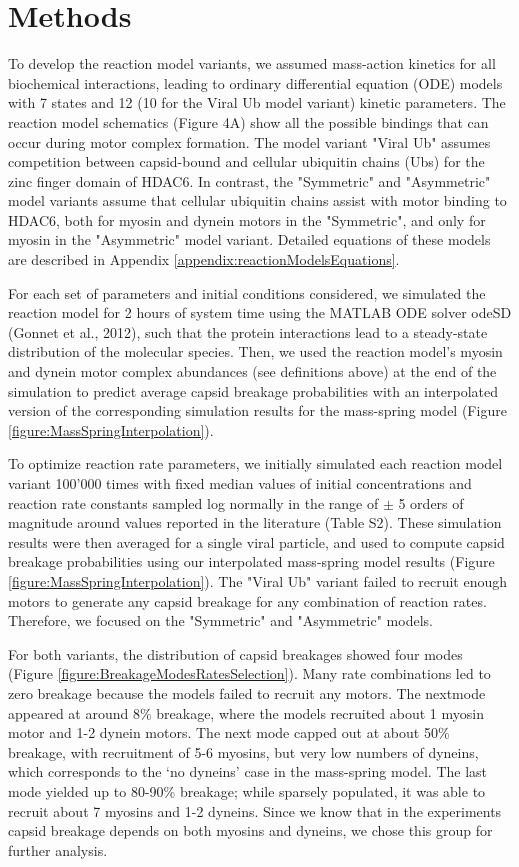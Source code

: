 \section{Methods}

To develop the reaction model variants, we assumed mass-action kinetics for all biochemical interactions, leading to ordinary differential equation (ODE) models with 7 states and 12 (10 for the Viral Ub model variant) kinetic parameters. The reaction model schematics (Figure 4A) show all the possible bindings that can occur during motor complex formation. The model variant "Viral Ub" assumes competition between capsid-bound and cellular ubiquitin chains (Ubs) for the zinc finger domain of HDAC6. In contrast, the "Symmetric" and "Asymmetric" model variants assume that cellular ubiquitin chains assist with motor binding to HDAC6, both for myosin and dynein motors in the "Symmetric", and only for myosin in the "Asymmetric" model variant. Detailed equations of these models are described in Appendix \ref{appendix:reactionModelsEquations}.

For each set of parameters and initial conditions considered, we simulated the reaction model for 2 hours of system time using the MATLAB ODE solver odeSD (Gonnet et al., 2012), such that the protein interactions lead to a steady-state distribution of the molecular species. Then, we used the reaction model’s myosin and dynein motor complex abundances (see definitions above) at the end of the simulation to predict average capsid breakage probabilities with an interpolated version of the corresponding simulation results for the mass-spring model (Figure \ref{figure:MassSpringInterpolation}).

To optimize reaction rate parameters, we initially simulated each reaction model variant 100’000 times with fixed median values of initial concentrations and reaction rate constants sampled log normally in the range of $\pm$ 5 orders of magnitude around values reported in the literature (Table S2). These simulation results were then averaged for a single viral particle, and used to compute capsid breakage probabilities using our interpolated mass-spring model results (Figure \ref{figure:MassSpringInterpolation}). The "Viral Ub" variant failed to recruit enough motors to generate any capsid breakage for any combination of reaction rates. Therefore, we focused on the "Symmetric" and "Asymmetric" models.

For both variants, the distribution of capsid breakages showed four modes (Figure \ref{figure:BreakageModesRatesSelection}). Many rate combinations led to zero breakage because the models failed to recruit any motors. The nextmode appeared at around 8\% breakage, where the models recruited about 1 myosin motor and 1-2 dynein motors. The next mode capped out at about 50\% breakage, with recruitment of 5-6 myosins, but very low numbers of dyneins, which corresponds to the ‘no dyneins’ case in the mass-spring model. The last mode yielded up to 80-90\% breakage; while sparsely populated, it was able to recruit about 7 myosins and 1-2 dyneins. Since we know that in the experiments capsid breakage depends on both myosins and dyneins, we chose this group for further analysis.

